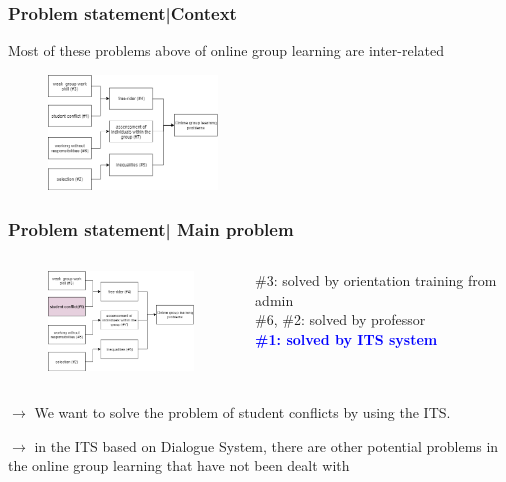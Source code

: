 \documentclass{beamer}
\begin{document}
\begin{frame}
\frametitle{Problem statement|Context}
Most of these problems above of online group learning are inter-related

		\begin{figure}
			\includegraphics[width=45mm]{p21.png}
		\end{figure}






\end{frame}

\begin{frame}
\frametitle{Problem statement| Main problem}

\begin{columns}
	\begin{column}{.55\textwidth}
	\begin{figure}
		\includegraphics[width=45mm]{p22.png}
	\end{figure}
	\end{column}
\begin{column}{.55\textwidth}
	\#3: solved by orientation training from admin \\
	\#6, \#2: solved by professor\\
	\textcolor{blue}{\textbf{\#1: solved by ITS system}}
\end{column}
\end{columns}
\begin{flushleft}
	
\end{flushleft}



$\rightarrow$	We want to solve the problem of student conflicts by using the ITS. 


$\rightarrow$ in the ITS based on Dialogue System, there are other potential problems in the online group learning that have not been dealt with





\end{frame}
\end{document}
